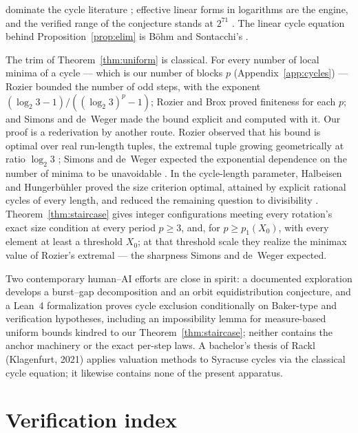 \documentclass[11pt]{article}
\theoremstyle{remark}
\newcommand{\LL}{\log_2 3}
\begin{document}
dominate the cycle literature \cite{steiner,rozier90,sdw,hercher,eliahou}; effective linear forms in logarithms \cite{yu,bl,rhin} are the engine, and the verified range of the conjecture stands at $2^{71}$ \cite{barina}. The linear cycle equation behind Proposition~\ref{prop:elim} is B\"ohm and Sontacchi's \cite{bohm}.

The trim of Theorem~\ref{thm:uniform} is classical. For every number of local minima of a cycle --- which is our number of blocks $p$ (Appendix~\ref{app:cycles}) --- Rozier \cite[Lemme~4]{rozier91} bounded the number of odd steps, with the exponent $(\LL-1)/((\LL)^p-1)$; Rozier \cite[Th\'eor\`eme, p.~8]{rozier91} and Brox \cite{brox} proved finiteness for each $p$; and Simons and de~Weger \cite[Lemmas~7, 14 and Theorem~3]{sdw} made the bound explicit and computed with it. Our proof is a rederivation by another route. Rozier observed that his bound is optimal over real run-length tuples, the extremal tuple growing geometrically at ratio $\LL$ \cite[p.~11]{rozier91}; Simons and de~Weger expected the exponential dependence on the number of minima to be unavoidable \cite[p.~69]{sdw}. In the cycle-length parameter, Halbeisen and Hungerb\"uhler \cite{hh} proved the size criterion optimal, attained by explicit rational cycles of every length, and reduced the remaining question to divisibility \cite[p.~238]{hh}. Theorem~\ref{thm:staircase} gives integer configurations meeting every rotation's exact size condition at every period $p \ge 3$, and, for $p \ge p_1(X_0)$, with every element at least a threshold $X_0$; at that threshold scale they realize the minimax value of Rozier's extremal --- the sharpness Simons and de~Weger expected.

Two contemporary human--AI efforts are close in spirit: a documented exploration \cite{llmcollatz} develops a burst--gap decomposition and an orbit equidistribution conjecture, and a Lean~4 formalization \cite{merle} proves cycle exclusion conditionally on Baker-type and verification hypotheses, including an impossibility lemma for measure-based uniform bounds kindred to our Theorem~\ref{thm:staircase}; neither contains the anchor machinery or the exact per-step laws. A bachelor's thesis of Rackl \cite{rackl} (Klagenfurt, 2021) applies valuation methods to Syracuse cycles via the classical cycle equation; it likewise contains none of the present apparatus.

\section{Verification index}\label{app:verify}
\end{document}
